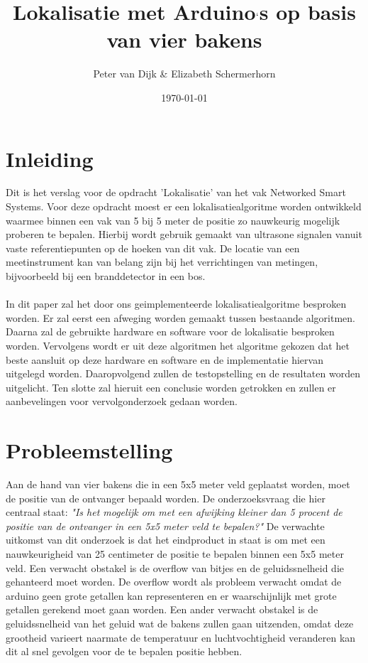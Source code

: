 \documentclass{article}
\author{Peter van Dijk \& Elizabeth Schermerhorn}
\date{\today}
\title{Lokalisatie met Arduino$`$s op basis van vier bakens}
\begin{document}
\maketitle
\newpage
\tableofcontents
\clearpage
\section{Inleiding}
Dit is het verslag voor de opdracht 'Lokalisatie' van het vak Networked Smart Systems. Voor deze opdracht moest er een lokalisatiealgoritme worden ontwikkeld waarmee binnen een vak van 5 bij 5 meter de positie zo nauwkeurig mogelijk proberen te bepalen. Hierbij wordt gebruik gemaakt van ultrasone signalen vanuit vaste referentiepunten op de hoeken van dit vak. De locatie van een meetinstrument kan van belang zijn bij het verrichtingen van metingen, bijvoorbeeld bij een branddetector in een bos. \\
\\
In dit paper zal het door ons geimplementeerde lokalisatiealgoritme besproken worden. Er zal eerst een afweging worden gemaakt tussen bestaande algoritmen. Daarna zal de gebruikte hardware en software voor de lokalisatie besproken worden. Vervolgens wordt er uit deze algoritmen het algoritme gekozen dat het beste aansluit op deze hardware en software en de implementatie hiervan uitgelegd worden. Daaropvolgend zullen de testopstelling en de resultaten worden uitgelicht. Ten slotte zal hieruit een conclusie worden getrokken en zullen er aanbevelingen voor vervolgonderzoek gedaan worden.


\section{Probleemstelling}
Aan de hand van vier bakens die in een 5x5 meter veld geplaatst worden, moet de positie van de ontvanger bepaald worden. De onderzoeksvraag die hier centraal staat: \textit{"Is het mogelijk om met een afwijking kleiner dan 5 procent de positie van de ontvanger in een 5x5 meter veld te bepalen?"}
De verwachte uitkomst van dit onderzoek is dat het eindproduct in staat is om met een nauwkeurigheid van 25 centimeter de positie te bepalen binnen een 5x5 meter veld. Een verwacht obstakel is de overflow van bitjes en de geluidssnelheid die gehanteerd moet worden. De overflow wordt als probleem verwacht omdat de arduino geen grote getallen kan representeren en er waarschijnlijk met grote getallen gerekend moet gaan worden. Een ander verwacht obstakel is de geluidssnelheid van het geluid wat de bakens zullen gaan uitzenden, omdat deze grootheid varieert naarmate de temperatuur en luchtvochtigheid veranderen kan dit al snel gevolgen voor de te bepalen positie hebben.  
\end{document}
